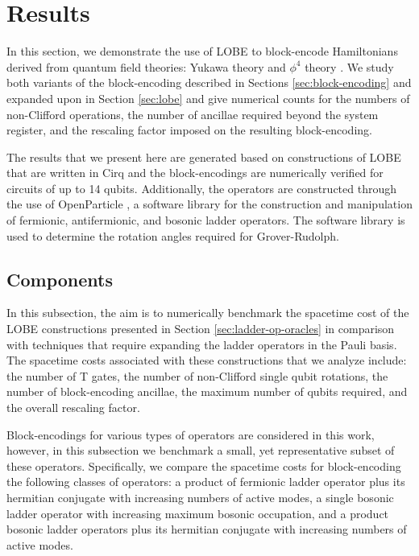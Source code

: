 \section{Results}
\label{sec:results}

In this section, we demonstrate the use of LOBE to block-encode Hamiltonians derived from quantum field theories: Yukawa theory and $\phi^4$ theory \cite{Peskin:1995ev}.
We study both variants of the block-encoding described in Sections \ref{sec:block-encoding} and expanded upon in Section \ref{sec:lobe} and give numerical counts for the numbers of non-Clifford operations, the number of ancillae required beyond the system register, and the rescaling factor imposed on the resulting block-encoding.

The results that we present here are generated based on constructions of LOBE that are written in Cirq \cite{cirq} and the block-encodings are numerically verified for circuits of up to 14 qubits.
Additionally, the operators are constructed through the use of OpenParticle \cite{openparticle}, a software library for the construction and manipulation of fermionic, antifermionic, and bosonic ladder operators.
The software library \cite{grover-rudolph-github} is used to determine the rotation angles required for Grover-Rudolph.

\subsection{Components}

In this subsection, the aim is to numerically benchmark the spacetime cost of the LOBE constructions presented in Section \ref{sec:ladder-op-oracles} in comparison with techniques that require expanding the ladder operators in the Pauli basis.
The spacetime costs associated with these constructions that we analyze include: the number of T gates, the number of non-Clifford single qubit rotations, the number of block-encoding ancillae, the maximum number of qubits required, and the overall rescaling factor.

Block-encodings for various types of operators are considered in this work, however, in this subsection we benchmark a small, yet representative subset of these operators.
Specifically, we compare the spacetime costs for block-encoding the following classes of operators: a product of fermionic ladder operator plus its hermitian conjugate with increasing numbers of active modes, a single bosonic ladder operator with increasing maximum bosonic occupation, and a product bosonic ladder operators plus its hermitian conjugate with increasing numbers of active modes.

